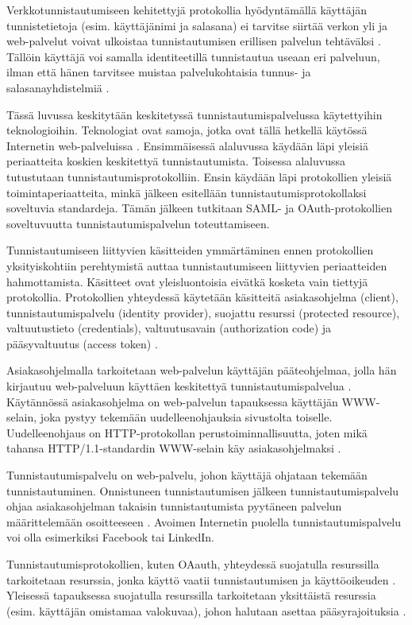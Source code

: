 Verkkotunnistautumiseen kehitettyjä protokollia hyödyntämällä käyttäjän tunnistetietoja (esim. käyttäjänimi ja salasana) ei tarvitse siirtää verkon yli ja web-palvelut voivat ulkoistaa tunnistautumisen erillisen palvelun tehtäväksi \cite{nisti}. Tällöin käyttäjä voi samalla identiteetillä tunnistautua useaan eri palveluun, ilman että hänen tarvitsee muistaa palvelukohtaisia tunnus- ja salasanayhdistelmiä \cite{open_identity}.

Tässä luvussa keskitytään keskitetyssä tunnistautumispalvelussa käytettyihin teknologioihin. Teknologiat ovat samoja, jotka ovat tällä hetkellä käytössä Internetin web-palveluissa \cite{facebook}. Ensimmäisessä alaluvussa käydään läpi yleisiä periaatteita koskien keskitettyä tunnistautumista. Toisessa alaluvussa tutustutaan tunnistautumisprotokolliin. Ensin käydään läpi protokollien yleisiä toimintaperiaatteita, minkä jälkeen esitellään tunnistautumisprotokollaksi soveltuvia standardeja. Tämän jälkeen tutkitaan SAML- ja OAuth-protokollien soveltuvuutta tunnistautumispalvelun toteuttamiseen.

Tunnistautumiseen liittyvien käsitteiden ymmärtäminen ennen protokollien yksityiskohtiin perehtymistä auttaa tunnistautumiseen liittyvien periaatteiden hahmottamista. Käsitteet ovat yleisluontoisia eivätkä kosketa vain tiettyjä protokollia. Protokollien yhteydessä käytetään käsitteitä asiakasohjelma (client), tunnistautumispalvelu (identity provider), suojattu resurssi (protected resource), valtuutustieto (credentials), valtuutusavain (authorization code) ja pääsyvaltuutus (access token) \cite{nisti}.

Asiakasohjelmalla tarkoitetaan web-palvelun käyttäjän pääteohjelmaa, jolla hän kirjautuu web-palveluun käyttäen keskitettyä tunnistautumispalvelua \cite{nisti}. Käytännössä asiakasohjelma on web-palvelun tapauksessa käyttäjän WWW-selain, joka pystyy tekemään uudelleenohjauksia sivustolta toiselle. Uudelleenohjaus on HTTP-pro\-to\-kol\-lan perustoiminnallisuutta, joten mikä tahansa HTTP/1.1-standardin WWW-selain käy asiakasohjelmaksi \cite{rfc2616}.

Tunnistautumispalvelu on web-palvelu, johon käyttäjä ohjataan tekemään tunnistautuminen. Onnistuneen tunnistautumisen jälkeen tunnistautumispalvelu ohjaa asi\-a\-kas\-oh\-jel\-man takaisin tunnistautumista pyytäneen palvelun määrittelemään osoitteeseen \cite{nisti}. Avoimen Internetin puolella tunnistautumispalvelu voi olla esimerkiksi Facebook tai LinkedIn.

Tunnistautumisprotokollien, kuten OAauth, yhteydessä suojatulla resurssilla tarkoitetaan resurssia, jonka käyttö vaatii tunnistautumisen ja käyttöoikeuden \cite{oauth2_0}. Yleisessä tapauksessa suojatulla resurssilla tarkoitetaan yksittäistä resurssia (esim. käyttäjän omistamaa valokuvaa), johon halutaan asettaa pääsyrajoituksia \cite{nisti}.

